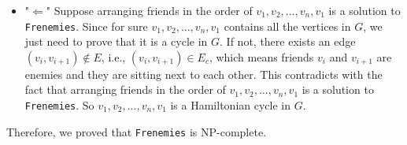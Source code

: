\documentclass{article}
\begin{document}
\begin{tcolorbox}
\begin{itemize}
\begin{itemize}
\item "$\Leftarrow$" Suppose arranging friends in the order of $v_1, v_2, ..., v_n, v_1$ is a solution to \texttt{Frenemies}. Since for sure $v_1, v_2, ..., v_n, v_1$ contains all the vertices in $G$, we just need to prove that it is a cycle in $G$.  If not, there exists an edge $(v_i, v_{i+1}) \notin E$, i.e.,  $(v_i, v_{i+1}) \in E_c$, which means friends $v_i$ and $v_{i+1}$ are enemies and they are sitting next to each other. This contradicts with the fact that arranging friends in the order of $v_1, v_2, ..., v_n, v_1$ is a solution to \texttt{Frenemies}. So $v_1, v_2, ..., v_n, v_1$ is a Hamiltonian cycle in $G$. 
\end{itemize} 
Therefore, we proved that \texttt{Frenemies} is NP-complete.
\end{itemize}
\end{tcolorbox}
\newpage
\end{document}
